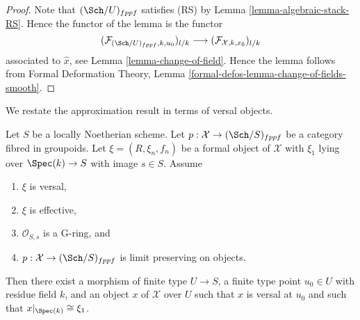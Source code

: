 \begin{proof}
Note that $(\Sch/U)_{fppf}$ satisfies (RS) by
Lemma \ref{lemma-algebraic-stack-RS}.
Hence the functor of the lemma is the functor
$$
(\mathcal{F}_{(\Sch/U)_{fppf}, k , u_0})_{l/k}
\longrightarrow
(\mathcal{F}_{\mathcal{X}, k , x_0})_{l/k}
$$
associated to $\hat x$, see Lemma \ref{lemma-change-of-field}.
Hence the lemma follows from
Formal Deformation Theory, Lemma
\ref{formal-defos-lemma-change-of-fields-smooth}.
\end{proof}

\noindent
We restate the approximation result in terms of
versal objects.

\begin{lemma}
\label{lemma-approximate-versal}
Let $S$ be a locally Noetherian scheme. Let
$p : \mathcal{X} \to (\Sch/S)_{fppf}$ be a category fibred in groupoids.
Let $\xi = (R, \xi_n, f_n)$ be a formal object of $\mathcal{X}$ with
$\xi_1$ lying over $\Spec(k) \to S$ with image $s \in S$. Assume
\begin{enumerate}
\item $\xi$ is versal,
\item $\xi$ is effective,
\item $\mathcal{O}_{S, s}$ is a G-ring, and
\item $p : \mathcal{X} \to (\Sch/S)_{fppf}$ is limit preserving on objects.
\end{enumerate}
Then there exist a morphism of finite type $U \to S$, a finite type
point $u_0 \in U$ with residue field $k$, and an object $x$ of $\mathcal{X}$
over $U$ such that $x$ is versal at $u_0$ and such that
$x|_{\Spec(k)} \cong \xi_1$.
\end{lemma}

